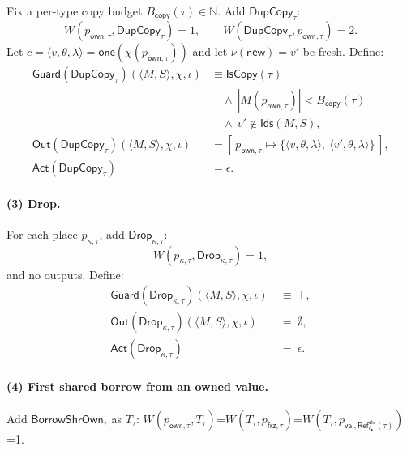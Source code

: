 \documentclass[sigconf]{acmart}
\begin{document}
Fix a per-type copy budget $B_{\mathsf{copy}}(\tau)\in\mathbb{N}$.
Add $\mathsf{DupCopy}_\tau$:
\begin{equation*}
    W(p_{\mathsf{own},\tau},\mathsf{DupCopy}_\tau)=1,\qquad
    W(\mathsf{DupCopy}_\tau,p_{\mathsf{own},\tau})=2.
\end{equation*}
Let $c=\langle v,\theta,\lambda\rangle=\mathsf{one}(\chi(p_{\mathsf{own},\tau}))$ and let $\nu(\mathsf{new})=v'$ be fresh.
Define:
\begin{align*}
\mathsf{Guard}(\mathsf{DupCopy}_\tau)(\langle M,S\rangle,\chi,\iota)
&\equiv \mathsf{IsCopy}(\tau) \\
&\quad \wedge\ |M(p_{\mathsf{own},\tau})| < B_{\mathsf{copy}}(\tau)\\ &\quad \wedge\ v'\notin \mathsf{Ids}(M,S),\\
\mathsf{Out}(\mathsf{DupCopy}_\tau)(\langle M,S\rangle,\chi,\iota)
&= [\,p_{\mathsf{own},\tau}\mapsto \{\langle v,\theta,\lambda\rangle,\ \langle v',\theta,\lambda\rangle\}\,],\\
\mathsf{Act}(\mathsf{DupCopy}_\tau)
&= \epsilon.
\end{align*}

\paragraph{(3) Drop.}
For each place $p_{\kappa,\tau}$, add $\mathsf{Drop}_{\kappa,\tau}$:
\[
W(p_{\kappa,\tau},\mathsf{Drop}_{\kappa,\tau})=1,
\]
and no outputs. Define:
\begin{align*}
\mathsf{Guard}(\mathsf{Drop}_{\kappa,\tau})(\langle M,S\rangle,\chi,\iota) &~\equiv~ \top,\\
\mathsf{Out}(\mathsf{Drop}_{\kappa,\tau})(\langle M,S\rangle,\chi,\iota) &~=~ \emptyset,\\
\mathsf{Act}(\mathsf{Drop}_{\kappa,\tau}) &~=~ \epsilon.
\end{align*}

\paragraph{(4) First shared borrow from an owned value.}
Add $\mathsf{BorrowShrOwn}_\tau$ as $T_\tau$: $W(p_{\mathsf{own},\tau},T_\tau)$=$W(T_\tau,p_{\mathsf{frz},\tau})$=$W(T_\tau,p_{\mathsf{val},\mathsf{Ref}^{\mathsf{shr}}_{\ell_{\bullet}}(\tau)})$=1.
\end{document}
